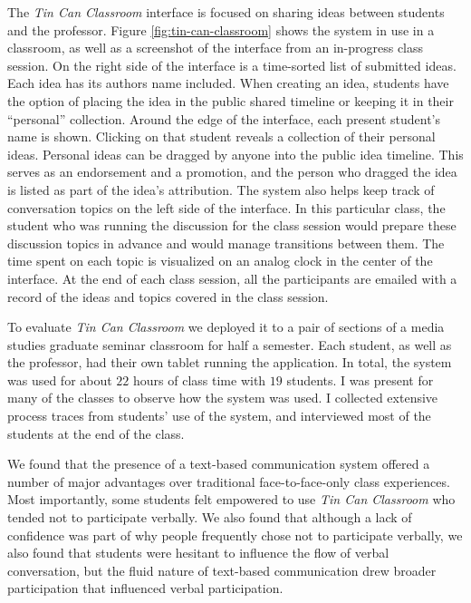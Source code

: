 \documentclass{tufte-handout}
\begin{document}
The \emph{Tin Can Classroom} interface is focused on sharing ideas between students and the professor. Figure \ref{fig:tin-can-classroom} shows the system in use in a classroom, as well as a screenshot of the interface from an in-progress class session. On the right side of the interface is a time-sorted list of submitted ideas. Each idea has its authors name included. When creating an idea, students have the option of placing the idea in the public shared timeline or keeping it in their ``personal'' collection. Around the edge of the interface, each present student's name is shown. Clicking on that student reveals a collection of their personal ideas. Personal ideas can be dragged by anyone into the public idea timeline. This serves as an endorsement and a promotion, and the person who dragged the idea is listed as part of the idea's attribution. The system also helps keep track of conversation topics on the left side of the interface. In this particular class, the student who was running the discussion for the class session would prepare these discussion topics in advance and would manage transitions between them. The time spent on each topic is visualized on an analog clock in the center of the interface. At the end of each class session, all the participants are emailed with a record of the ideas and topics covered in the class session.

To evaluate \emph{Tin Can Classroom} we deployed it to a pair of sections of a media studies graduate seminar classroom for half a semester. Each student, as well as the professor, had their own tablet running the application. In total, the system was used for about $22$ hours of class time with $19$ students. I was present for many of the classes to observe how the system was used. I collected extensive process traces from students' use of the system, and interviewed most of the students at the end of the class.

We found that the presence of a text-based communication system offered a number of major advantages over traditional face-to-face-only class experiences. Most importantly, some students felt empowered to use \emph{Tin Can Classroom} who tended not to participate verbally. We also found that although a lack of confidence was part of why people frequently chose not to participate verbally, we also found that students were hesitant to influence the flow of verbal conversation, but the fluid nature of text-based communication drew broader participation that influenced verbal participation.
\end{document}
